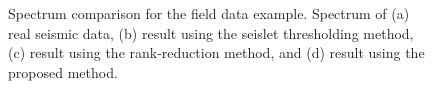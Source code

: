 \begin{figure}[htb!]
	\centering
    \\
    \\
	\caption{Spectrum comparison for the field data example. Spectrum of (a) real seismic data, (b) result using the seislet thresholding method, (c) result using the rank-reduction method, and (d) result using the proposed method. }
	\label{fig:real-fks}
\end{figure}

